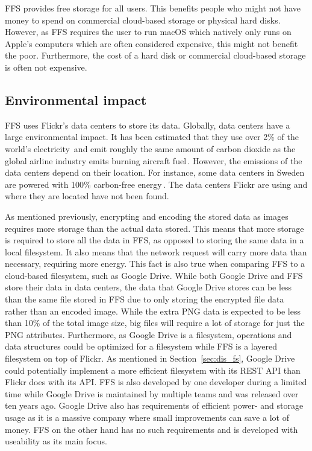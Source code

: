 \gls{FFS} provides free storage for all users. This benefits people who might not have money to spend on commercial \mbox{cloud-based} storage or physical hard disks. However, as \gls{FFS} requires the user to run macOS which natively only runs on Apple's computers which are often considered expensive, this might not benefit the poor. Furthermore, the cost of a hard disk or commercial \mbox{cloud-based} storage is often not expensive.

\subsection{Environmental impact}
\label{subsec:imp_env}
\gls{FFS} uses Flickr's data centers to store its data. Globally, data centers have a large environmental impact. It has been estimated that they use over 2\% of the world's electricity\,\cite{mcleanDataCentersGenerate2020} and emit roughly the same amount of carbon dioxide as the global airline industry emits burning aircraft fuel\,\cite{pearceEnergyHogsCan}. However, the emissions of the data centers depend on their location. For instance, some data centers in Sweden are powered with 100\% carbon-free energy\,\cite{cappellaSwedenSustainableData2022,unfcccEcoDataCenterSwedenUNFCCC}. The data centers Flickr are using and where they are located have not been found.

As mentioned previously, encrypting and encoding the stored data as images requires more storage than the actual data stored. This means that more storage is required to store all the data in \gls{FFS}, as opposed to storing the same data in a local filesystem. It also means that the network request will carry more data than necessary, requiring more energy. This fact is also true when comparing \gls{FFS} to a \mbox{cloud-based} filesystem, such as Google Drive. While both Google Drive and \gls{FFS} store their data in data centers, the data that Google Drive stores can be less than the same file stored in \gls{FFS} due to only storing the encrypted file data rather than an encoded image. While the extra PNG data is expected to be less than 10\% of the total image size, big files will require a lot of storage for just the PNG attributes. Furthermore, as Google Drive is a filesystem, operations and data structures could be optimized for a filesystem while \gls{FFS} is a layered filesystem on top of Flickr. As mentioned in Section~\ref{sec:dis_fs}, Google Drive could potentially implement a more efficient filesystem with its REST \gls{API} than Flickr does with its \gls{API}. \gls{FFS} is also developed by one developer during a limited time while Google Drive is maintained by multiple teams and was released over ten years ago. Google Drive also has requirements of efficient power- and storage usage as it is a massive company where small improvements can save a lot of money. \gls{FFS} on the other hand has no such requirements and is developed with useability as its main focus. 

